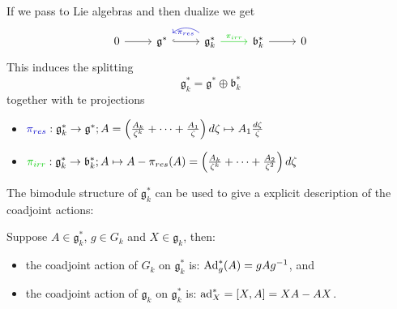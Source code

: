 \begin{frame}[fragile]
  If we pass to Lie algebras and then dualize we get
  \[ \begin{tikzcd}[row sep=0]
  0 \rar & \mathfrak{g}^* \arrow[hook]{r}
         & \mathfrak{g}_k^* \rar[green!80!black]{\pi_{irr}}
                            \arrow[bend right=40,blue!80!black]{l}{\pi_{res}}
         & \mathfrak{b}_k^* \rar
         & 0
  \end{tikzcd} \]
  This induces the splitting
  \[
    \mathfrak{g}_k^*= \mathfrak{g}^*\oplus \mathfrak{b}_k^*
  \]
  together with te projections
  \begin{itemize}
    \item $\textcolor{blue!80!black}{\pi_{res}}:
      \mathfrak{g}_k^*\to\mathfrak{g}^*;
      A=\left(\frac{A_k}{\zeta^k}+\dots+\frac{A_1}{\zeta}\right)d\zeta \mapsto
        A_1\frac{d\zeta}{\zeta}$
    \item $\textcolor{green!80!black}{\pi_{irr}}:
      \mathfrak{g}_k^*\to\mathfrak{b}_k^*; A\mapsto A-\pi_{res}(A)=
        \left(\frac{A_k}{\zeta^k}+\dots+\frac{A_2}{\zeta^2}\right)d\zeta$
  \end{itemize}
  The bimodule structure of $\mathfrak{g}_k^*$ can be used to give a explicit
  description of the coadjoint actions:
  \begin{lem}
    Suppose $A\in\mathfrak{g}_k^*$, $g\in G_k$ and $X\in\mathfrak{g}_k$, then:
    \begin{itemize}
      \item the coadjoint action of $G_k$ on $\mathfrak{g}_k^*$ is:
      $\operatorname{Ad}_g^*(A)=gAg^{-1}$, and
      \item the coadjoint action of $\mathfrak{g}_k$ on $\mathfrak{g}_k^*$ is:
      $\operatorname{ad}_X^*=[X,A]=XA-AX$.
    \end{itemize}
  \end{lem}
\end{frame}

